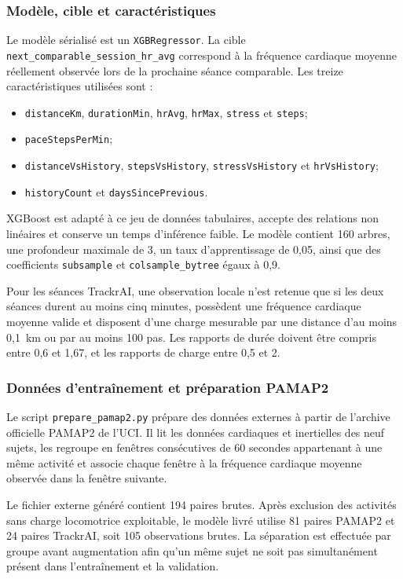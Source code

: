 \documentclass[11pt,a4paper]{article}
\newcommand{\code}[1]{\nolinkurl{#1}}
\begin{document}
\subsubsection{Modèle, cible et caractéristiques}

Le modèle sérialisé est un \code{XGBRegressor}. La cible \code{next_comparable_session_hr_avg} correspond à la fréquence cardiaque moyenne réellement observée lors de la prochaine séance comparable. Les treize caractéristiques utilisées sont :

\begin{itemize}
  \item \code{distanceKm}, \code{durationMin}, \code{hrAvg}, \code{hrMax}, \code{stress} et \code{steps};
  \item \code{paceStepsPerMin};
  \item \code{distanceVsHistory}, \code{stepsVsHistory}, \code{stressVsHistory} et \code{hrVsHistory};
  \item \code{historyCount} et \code{daysSincePrevious}.
\end{itemize}

XGBoost est adapté à ce jeu de données tabulaires, accepte des relations non linéaires et conserve un temps d'inférence faible. Le modèle contient 160 arbres, une profondeur maximale de 3, un taux d'apprentissage de 0,05, ainsi que des coefficients \code{subsample} et \code{colsample_bytree} égaux à 0,9.

Pour les séances TrackrAI, une observation locale n'est retenue que si les deux séances durent au moins cinq minutes, possèdent une fréquence cardiaque moyenne valide et disposent d'une charge mesurable par une distance d'au moins 0,1~km ou par au moins 100 pas. Les rapports de durée doivent être compris entre 0,6 et 1,67, et les rapports de charge entre 0,5 et 2.

\subsubsection{Données d'entraînement et préparation PAMAP2}

Le script \code{prepare_pamap2.py} prépare des données externes à partir de l'archive officielle PAMAP2 de l'UCI. Il lit les données cardiaques et inertielles des neuf sujets, les regroupe en fenêtres consécutives de 60 secondes appartenant à une même activité et associe chaque fenêtre à la fréquence cardiaque moyenne observée dans la fenêtre suivante.

Le fichier externe généré contient 194 paires brutes. Après exclusion des activités sans charge locomotrice exploitable, le modèle livré utilise 81 paires PAMAP2 et 24 paires TrackrAI, soit 105 observations brutes. La séparation est effectuée par groupe avant augmentation afin qu'un même sujet ne soit pas simultanément présent dans l'entraînement et la validation.
\end{document}
